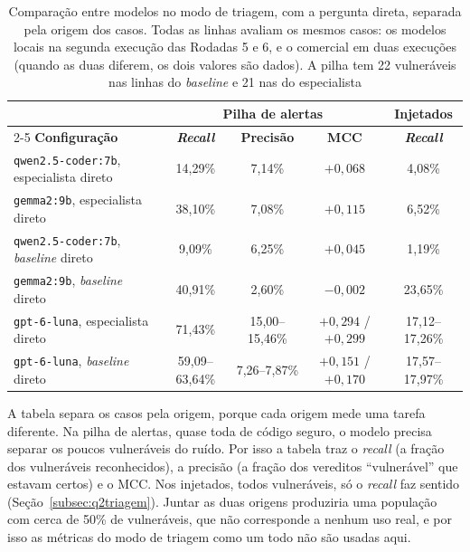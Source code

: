\begin{table}[htpb]
    \centering
    \caption[Comparação entre modelos, por origem]{Comparação entre modelos no modo de triagem, com a pergunta direta, separada pela origem dos casos. Todas as linhas avaliam os mesmos casos: os modelos locais na segunda execução das Rodadas 5 e 6, e o comercial em duas execuções (quando as duas diferem, os dois valores são dados). A pilha tem 22 vulneráveis nas linhas do \textit{baseline} e 21 nas do especialista}
    \label{tab:modelos}
    \renewcommand{\arraystretch}{1.4}
    \setlength{\tabcolsep}{3pt}
    \footnotesize
    \begin{tabular}{|l|c|c|c|c|}
        \hline
         & \multicolumn{3}{c|}{\textbf{Pilha de alertas}} & \textbf{Injetados} \\
        \cline{2-5}
        \textbf{Configuração} & \textbf{\textit{Recall}} & \textbf{Precisão} & \textbf{MCC} & \textbf{\textit{Recall}} \\
        \hline
        \texttt{qwen2.5-coder:7b}, especialista direto & 14,29\% & 7,14\% & $+0{,}068$ & 4,08\% \\
        \hline
        \texttt{gemma2:9b}, especialista direto & 38,10\% & 7,08\% & $+0{,}115$ & 6,52\% \\
        \hline
        \texttt{qwen2.5-coder:7b}, \textit{baseline} direto & 9,09\% & 6,25\% & $+0{,}045$ & 1,19\% \\
        \hline
        \texttt{gemma2:9b}, \textit{baseline} direto & 40,91\% & 2,60\% & $-0{,}002$ & 23,65\% \\
        \hline
        \texttt{gpt-6-luna}, especialista direto & 71,43\% & 15,00--15,46\% & $+0{,}294$ / $+0{,}299$ & 17,12--17,26\% \\
        \hline
        \texttt{gpt-6-luna}, \textit{baseline} direto & 59,09--63,64\% & 7,26--7,87\% & $+0{,}151$ / $+0{,}170$ & 17,57--17,97\% \\
        \hline
    \end{tabular}
    \fontepesquisa
\end{table}

A tabela separa os casos pela origem, porque cada origem mede uma tarefa diferente. Na pilha de alertas, quase toda de código seguro, o modelo precisa separar os poucos vulneráveis do ruído. Por isso a tabela traz o \textit{recall} (a fração dos vulneráveis reconhecidos), a precisão (a fração dos vereditos ``vulnerável'' que estavam certos) e o MCC. Nos injetados, todos vulneráveis, só o \textit{recall} faz sentido (Seção~\ref{subsec:q2triagem}). Juntar as duas origens produziria uma população com cerca de 50\% de vulneráveis, que não corresponde a nenhum uso real, e por isso as métricas do modo de triagem como um todo não são usadas aqui.

